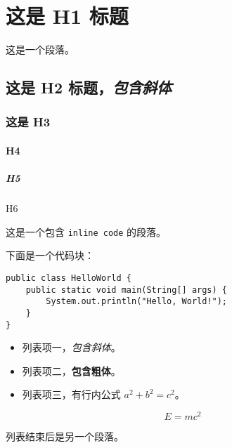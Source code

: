 \section{这是 H1 标题}

这是一个段落。

\subsection{\texorpdfstring{这是 H2
标题，\emph{包含斜体}}{这是 H2 标题，包含斜体}}

\subsubsection{这是 H3}

\paragraph{H4}

\subparagraph{H5}

H6

这是一个包含 \texttt{inline\ code} 的段落。

下面是一个代码块：

\begin{verbatim}
public class HelloWorld {
    public static void main(String[] args) {
        System.out.println("Hello, World!");
    }
}
\end{verbatim}

\begin{itemize}
\item
  列表项一，\emph{包含斜体}。
\item
  列表项二，\textbf{包含粗体}。
\item
  列表项三，有行内公式 \(a^2 + b^2 = c^2\)。
\end{itemize}

\[E = mc^2\]

列表结束后是另一个段落。
